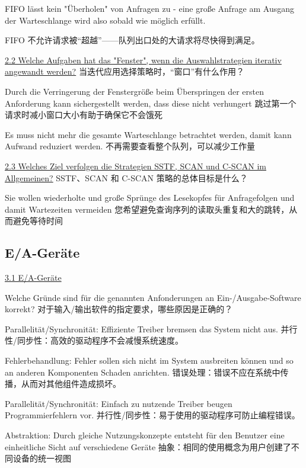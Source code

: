 \documentclass[fleqn]{article}
\begin{document}
FIFO lässt kein "Überholen" von Anfragen zu - eine große Anfrage am Ausgang der Warteschlange wird also sobald wie möglich erfüllt.

FIFO 不允许请求被“超越”——队列出口处的大请求将尽快得到满足。

\noindent\uline{2.2 Welche Aufgaben hat das "Fenster", wenn die Auswahlstrategien iterativ angewandt werden?}
当迭代应用选择策略时，“窗口”有什么作用？

Durch die Verringerung der Fenstergröße beim Überspringen der ersten Anforderung kann sichergestellt werden, dass diese nicht verhungert
跳过第一个请求时减小窗口大小有助于确保它不会饿死

Es muss nicht mehr die gesamte Warteschlange betrachtet werden, damit kann Aufwand reduziert werden.
不再需要查看整个队列，可以减少工作量

\noindent\uline{2.3 Welches Ziel verfolgen die Strategien SSTF, SCAN und C-SCAN im Allgemeinen?}
SSTF、SCAN 和 C-SCAN 策略的总体目标是什么？

Sie wollen wiederholte und große Sprünge des Lesekopfes für Anfragefolgen und damit Wartezeiten vermeiden
您希望避免查询序列的读取头重复和大的跳转，从而避免等待时间


\subsection{E/A-Geräte}

\noindent\uline{3.1 E/A-Geräte}

\noindent Welche Gründe sind für die genannten Anfonderungen an Ein-/Ausgabe-Software korrekt?
对于输入/输出软件的指定要求，哪些原因是正确的？

Parallelität/Synchronität: Effiziente Treiber bremsen das System nicht aus.
并行性/同步性：高效的驱动程序不会减慢系统速度。

Fehlerbehandlung: Fehler sollen sich nicht im System ausbreiten können und so an anderen Komponenten Schaden anrichten. 
错误处理：错误不应在系统中传播，从而对其他组件造成损坏。

Parallelität/Synchronität: Einfach zu nutzende Treiber beugen Programmierfehlern vor.
并行性/同步性：易于使用的驱动程序可防止编程错误。

Abstraktion: Durch gleiche Nutzungskonzepte entsteht für den Benutzer eine einheitliche Sicht auf verschiedene Geräte
抽象：相同的使用概念为用户创建了不同设备的统一视图
\end{document}
